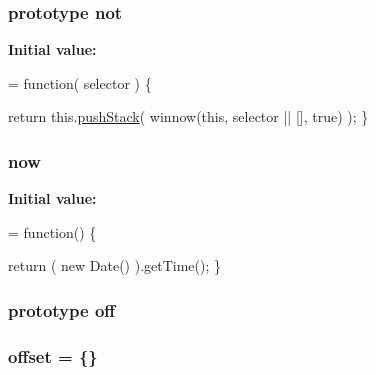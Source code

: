\hypertarget{jquery-1_810_82-vsdoc_8js_a78ab1ea877c73295e1e4cd1002ad38c7}{
\subsubsection[{not}]{ {\bf prototype} not}}\label{jquery-1_810_82-vsdoc_8js_a78ab1ea877c73295e1e4cd1002ad38c7}
{\bfseries Initial value\-:}
\begin{DoxyCode}
= \textcolor{keyword}{function}( selector ) \{


        \textcolor{keywordflow}{return} this.\hyperlink{jquery-1_810_82-vsdoc_8js_afc3a7db1ef2b526338c06c07cecccd44}{pushStack}( winnow(\textcolor{keyword}{this}, selector || [], \textcolor{keyword}{true}) );
    \}
\end{DoxyCode}
\hypertarget{jquery-1_810_82-vsdoc_8js_a1ecd248e0e501ce89712536174fdc6e3}{
\subsubsection[{now}]{ now}}\label{jquery-1_810_82-vsdoc_8js_a1ecd248e0e501ce89712536174fdc6e3}
{\bfseries Initial value\-:}
\begin{DoxyCode}
= \textcolor{keyword}{function}() \{


        \textcolor{keywordflow}{return} ( \textcolor{keyword}{new} Date() ).getTime();
    \}
\end{DoxyCode}
\hypertarget{jquery-1_810_82-vsdoc_8js_abd3345ae76b0b1425e11cd916e7bc97c}{
\subsubsection[{off}]{ {\bf prototype} off}}\label{jquery-1_810_82-vsdoc_8js_abd3345ae76b0b1425e11cd916e7bc97c}
\hypertarget{jquery-1_810_82-vsdoc_8js_a4a9f594d20d927164551fc7fa4751a2f}{
\subsubsection[{offset}]{ offset = \{\}}}\label{jquery-1_810_82-vsdoc_8js_a4a9f594d20d927164551fc7fa4751a2f}
